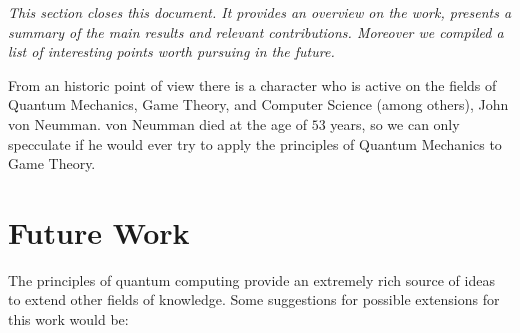 \label{cap:conclusions}

\textit{This section closes this document. It provides an overview on the work, presents a summary of the main results and relevant contributions. Moreover we compiled a list of interesting points worth pursuing in the future.}

From an historic point of view there is a character who is active on the fields of Quantum Mechanics, Game Theory, and Computer Science (among others), John von Neumman. von Neumman died at the age of $53$ years, so we can only specculate if he would ever try to apply the principles of Quantum Mechanics to Game Theory. 



\section{Future Work}
\label{sec:5FutureWork}

The principles of quantum computing provide an extremely rich source of ideas to extend other fields of knowledge.
Some suggestions for possible extensions for this work would be:

